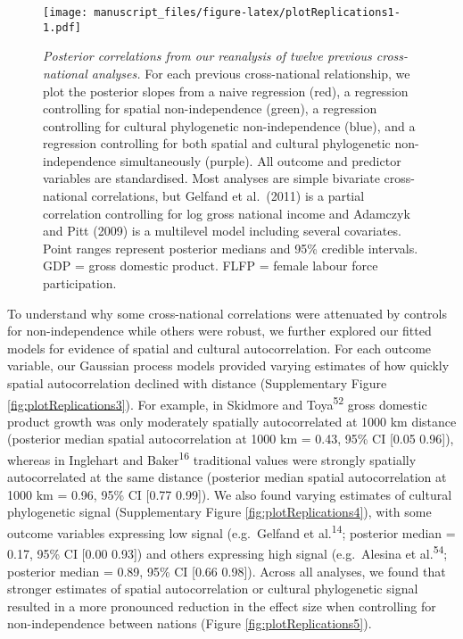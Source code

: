 \documentclass[
  english,
  man,floatsintext]{apa6}
\begin{document}
\begin{figure}
\centering
\texttt{[image: manuscript\_files/figure-latex/plotReplications1-1.pdf]}
\caption{\label{fig:plotReplications1}\emph{Posterior correlations from our reanalysis of twelve previous cross-national analyses.} For each previous cross-national relationship, we plot the posterior slopes from a naive regression (red), a regression controlling for spatial non-independence (green), a regression controlling for cultural phylogenetic non-independence (blue), and a regression controlling for both spatial and cultural phylogenetic non-independence simultaneously (purple). All outcome and predictor variables are standardised. Most analyses are simple bivariate cross-national correlations, but Gelfand et al.~(2011) is a partial correlation controlling for log gross national income and Adamczyk and Pitt (2009) is a multilevel model including several covariates. Point ranges represent posterior medians and 95\% credible intervals. GDP = gross domestic product. FLFP = female labour force participation.}
\end{figure}

To understand why some cross-national correlations were attenuated by controls for non-independence while others were robust, we further explored our fitted models for evidence of spatial and cultural autocorrelation. For each outcome variable, our Gaussian process models provided varying estimates of how quickly spatial autocorrelation declined with distance (Supplementary Figure \ref{fig:plotReplications3}). For example, in Skidmore and Toya\textsuperscript{52} gross domestic product growth was only moderately spatially autocorrelated at 1000 km distance (posterior median spatial autocorrelation at 1000 km = 0.43, 95\% CI {[}0.05 0.96{]}), whereas in Inglehart and Baker\textsuperscript{16} traditional values were strongly spatially autocorrelated at the same distance (posterior median spatial autocorrelation at 1000 km = 0.96, 95\% CI {[}0.77 0.99{]}). We also found varying estimates of cultural phylogenetic signal (Supplementary Figure \ref{fig:plotReplications4}), with some outcome variables expressing low signal (e.g.~Gelfand et al.\textsuperscript{14}; posterior median = 0.17, 95\% CI {[}0.00 0.93{]}) and others expressing high signal (e.g.~Alesina et al.\textsuperscript{54}; posterior median = 0.89, 95\% CI {[}0.66 0.98{]}). Across all analyses, we found that stronger estimates of spatial autocorrelation or cultural phylogenetic signal resulted in a more pronounced reduction in the effect size when controlling for non-independence between nations (Figure \ref{fig:plotReplications5}).
\end{document}
